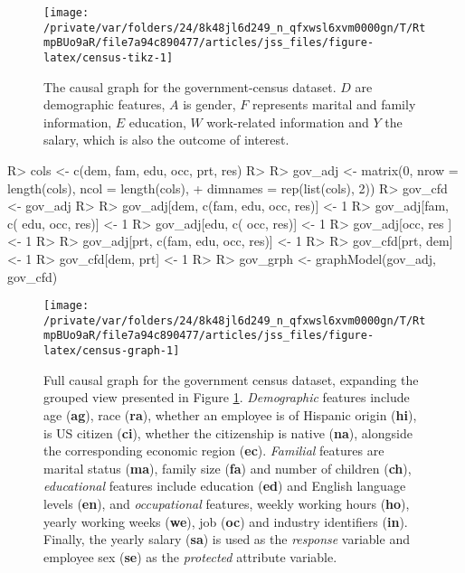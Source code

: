 \documentclass[
  nojss]{jss}
\begin{document}
\begin{CodeChunk}
\begin{figure}

{\centering \texttt{[image: /private/var/folders/24/8k48jl6d249\_n\_qfxwsl6xvm0000gn/T/RtmpBUo9aR/file7a94c890477/articles/jss\_files/figure-latex/census-tikz-1]} 

}

\caption[The causal graph for the government-census dataset]{The causal graph for the government-census dataset. $D$ are demographic features, $A$ is gender, $F$ represents marital and family information, $E$ education, $W$ work-related information and $Y$ the salary, which is also the outcome of interest.}\label{fig:census-tikz}
\end{figure}
\end{CodeChunk}

\begin{CodeChunk}
\begin{CodeInput}
R> cols <- c(dem, fam, edu, occ, prt, res)
R> 
R> gov_adj <- matrix(0, nrow = length(cols), ncol = length(cols),
+                   dimnames = rep(list(cols), 2))
R> gov_cfd <- gov_adj
R> 
R> gov_adj[dem, c(fam, edu, occ, res)] <- 1
R> gov_adj[fam, c(     edu, occ, res)] <- 1
R> gov_adj[edu, c(          occ, res)] <- 1
R> gov_adj[occ,                  res ] <- 1
R> 
R> gov_adj[prt, c(fam, edu, occ, res)] <- 1
R> 
R> gov_cfd[prt, dem] <- 1
R> gov_cfd[dem, prt] <- 1
R> 
R> gov_grph <- graphModel(gov_adj, gov_cfd)
\end{CodeInput}
\end{CodeChunk}

\begin{CodeChunk}
\begin{figure}

{\centering \texttt{[image: /private/var/folders/24/8k48jl6d249\_n\_qfxwsl6xvm0000gn/T/RtmpBUo9aR/file7a94c890477/articles/jss\_files/figure-latex/census-graph-1]} 

}

\caption{Full causal graph for the government census dataset, expanding the grouped view presented in Figure \ref{fig:census-tikz}. \textit{Demographic} features include age (\textbf{ag}), race (\textbf{ra}), whether an employee is of Hispanic origin (\textbf{hi}), is US citizen (\textbf{ci}), whether the citizenship is native (\textbf{na}), alongside the corresponding economic region (\textbf{ec}). \textit{Familial} features are marital status (\textbf{ma}), family size (\textbf{fa}) and number of children (\textbf{ch}), \textit{educational} features include education (\textbf{ed}) and English language levels (\textbf{en}), and \textit{occupational} features, weekly working hours (\textbf{ho}), yearly working weeks (\textbf{we}), job (\textbf{oc}) and industry identifiers (\textbf{in}). Finally, the yearly salary (\textbf{sa}) is used as the \textit{response} variable and employee sex (\textbf{se}) as the \textit{protected} attribute variable.}\label{fig:census-graph}
\end{figure}
\end{CodeChunk}
\end{document}
